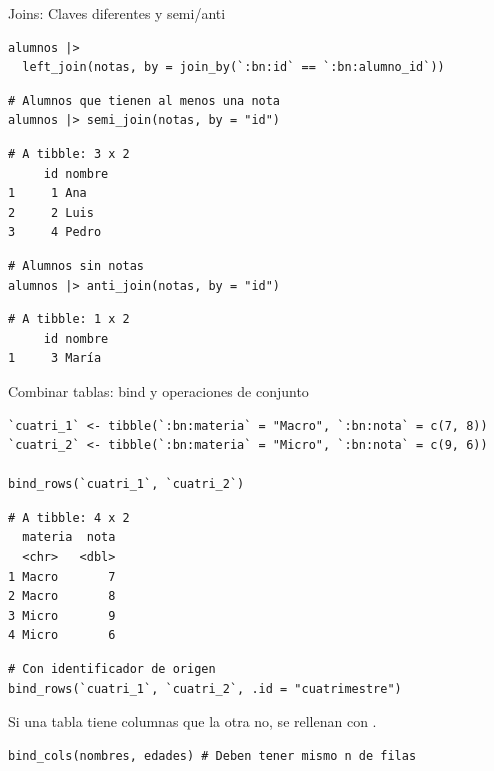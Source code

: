 \documentclass[8pt]{beamer}
\begin{document}
\begin{frame}[fragile]{Joins: Claves diferentes y semi/anti}
\begin{lstlisting}[style=RScript]
alumnos |>
  left_join(notas, by = join_by(`:bn:id` == `:bn:alumno_id`))
\end{lstlisting}

\begin{lstlisting}[style=RScript]
# Alumnos que tienen al menos una nota
alumnos |> semi_join(notas, by = "id")
\end{lstlisting}
\begin{lstlisting}[style=RConsole]
# A tibble: 3 x 2
     id nombre
1     1 Ana
2     2 Luis
3     4 Pedro
\end{lstlisting}

\begin{lstlisting}[style=RScript]
# Alumnos sin notas
alumnos |> anti_join(notas, by = "id")
\end{lstlisting}
\begin{lstlisting}[style=RConsole]
# A tibble: 1 x 2
     id nombre
1     3 María
\end{lstlisting}
\end{frame}






\begin{frame}[fragile]{Combinar tablas: bind y operaciones de conjunto}
\begin{lstlisting}[style=RScript]
`cuatri_1` <- tibble(`:bn:materia` = "Macro", `:bn:nota` = c(7, 8))
`cuatri_2` <- tibble(`:bn:materia` = "Micro", `:bn:nota` = c(9, 6))

bind_rows(`cuatri_1`, `cuatri_2`)
\end{lstlisting}
\begin{lstlisting}[style=RConsole]
# A tibble: 4 x 2
  materia  nota
  <chr>   <dbl>
1 Macro       7
2 Macro       8
3 Micro       9
4 Micro       6
\end{lstlisting}
\begin{lstlisting}[style=RScript]
# Con identificador de origen
bind_rows(`cuatri_1`, `cuatri_2`, .id = "cuatrimestre")
\end{lstlisting}
	Si una tabla tiene columnas que la otra no, se rellenan con .

\begin{lstlisting}[style=RScript]
bind_cols(nombres, edades) # Deben tener mismo n de filas
\end{lstlisting}
\end{frame}
\end{document}
